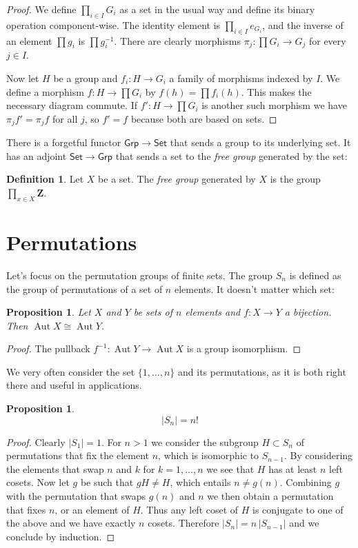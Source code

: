 \documentclass[11pt]{article}
\newtheorem{prop}[theo]{Proposition}
\theoremstyle{definition}
\newtheorem{defi}[theo]{Definition}
\def\grp{\mathsf{Grp}}
\def\set{\mathsf{Set}}
\def\ZZ{\mathbf{Z}}
\DeclareMathOperator{\aut}{Aut}
\begin{document}
\begin{proof}
We define $\prod_{i \in I} G_i$ as a set in the usual way and define its binary
operation component-wise.
The identity element is $\prod_{i \in I} e_{G_i}$, and the inverse of an
element $\prod g_i$ is $\prod g_i^{-1}$.
There are clearly morphisms $\pi_j : \prod G_i \to G_j$ for every $j \in I$.

Now let $H$ be a group and $f_i : H \to G_i$ a family of morphisms indexed by $I$.
We define a morphism $f : H \to \prod G_i$ by $f(h) = \prod f_i(h)$.
This makes the necessary diagram commute.
If $f' : H \to \prod G_i$ is another such morphism we have $\pi_j f' = \pi_j f$
for all $j$, so $f' = f$ because both are based on sets.
\end{proof}

There is a forgetful functor $\grp \to \set$ that sends a group to its
underlying set.
It has an adjoint $\set \to \grp$ that sends a set to the \emph{free group}
generated by the set:

\begin{defi}
Let $X$ be a set. The \emph{free group} generated by $X$ is the group
$\prod_{x \in X} \ZZ$.
\end{defi}



\section{Permutations}


Let's focus on the permutation groups of finite sets.
The group $S_n$ is defined as the group of permutations of a set of $n$ elements.
It doesn't matter which set:

\begin{prop}
Let $X$ and $Y$ be sets of $n$ elements and $f : X \to Y$ a bijection.
Then $\aut X \cong \aut Y$.
\end{prop}

\begin{proof}
The pullback $f^{-1} : \aut Y \to \aut X$ is a group isomorphism.
\end{proof}

We very often consider the set $\{1, \ldots, n\}$ and its permutations, as it
is both right there and useful in applications.


\begin{prop}
$$
|S_n| = n!
$$
\end{prop}


\begin{proof}
Clearly $|S_1| = 1$.
For $n > 1$ we consider the subgroup $H \subset S_n$ of permutations that fix
the element $n$, which is isomorphic to $S_{n-1}$.
By considering the elements that swap $n$ and $k$ for $k = 1, \ldots, n$ we see
that $H$ has at least $n$ left cosets.
Now let $g$ be such that $g H \not= H$, which entails $n \not= g(n)$.
Combining $g$ with the permutation that swaps $g(n)$ and $n$ we then obtain a permutation that fixes $n$, or an element of $H$.
Thus any left coset of $H$ is conjugate to one of the above and we have exactly
$n$ cosets.
Therefore
$|S_n| = n \, |S_{n-1}|$ and we conclude by induction.
\end{proof}
\end{document}
